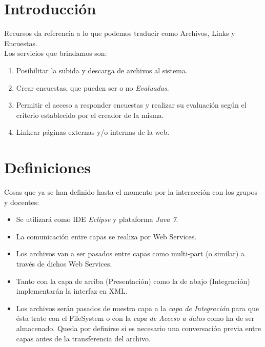 \documentclass{article}
\begin{document}
\section{Introducci\'on}
Recursos da referencia a lo que podemos traducir como Archivos, Links y Encuestas.\\
Los servicios que brindamos son:
\begin{enumerate}
	\item Posibilitar la subida y descarga de archivos al sistema.
	\item Crear encuestas, que pueden ser o no \emph{Evaluadas}.
	\item Permitir el acceso a responder encuestas y realizar su evaluaci\'on seg\'un el criterio establecido por el creador de la misma.
	\item Linkear p\'aginas externas y/o internas de la web.
\end{enumerate}

\section{Definiciones}
\begin{description}
	\item Cosas que ya se han definido hasta el momento por la interacci\'on con los grupos y docentes:
	\renewcommand{\labelitemi}{\ding{85}} 
	\begin{itemize}
		\item Se utilizar\'a como IDE \emph{Eclipse} y plataforma \emph{Java 7}.
		\item La comunicaci\'on entre capas se realiza por Web Services.
		\item Los archivos van a ser pasados entre capas como multi-part (o similar) a trav\'es de dichos Web Services.
		\item Tanto con la capa de arriba (Presentaci\'on) como la de abajo (Integraci\'on) implementar\'an la interfaz en XML.
		\item Los archivos ser\'an pasados de nuestra capa a la  \emph{capa de Integraci\'on}  para que \'esta trate con el FileSystem o con la \emph{capa de Acceso a datos} como ha de ser almacenado. Queda por definirse si es necesario una conversaci\'on previa entre capas antes de la transferencia del archivo.

	\end{itemize}


\end{description}
\end{document}
